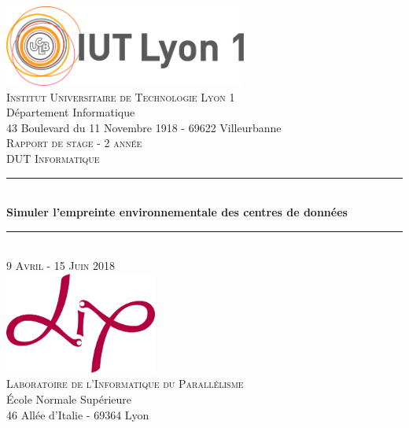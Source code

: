 \begin{titlepage}
\begin{spacing}{1}

\newcommand{\HRule}{\rule{\linewidth}{0.5mm}}
\center
 
\includegraphics[width=8cm]{pagedegarde/images/logo_iut.png}\\
\textsc{\large Institut Universitaire de Technologie Lyon 1} \\
\large Département Informatique\\43 Boulevard du 11 Novembre 1918 - 69622 Villeurbanne\\[3cm]


\textsc{\LARGE Rapport de stage - 2 année \\ DUT Informatique}\\
\HRule \\[0.8cm]
{ \huge \bfseries Simuler l'empreinte environnementale des centres de données}\\[0.4cm]
\HRule \\[0.5cm]

\textsc{\Large 9 Avril - 15 Juin 2018}\\[2cm]

\includegraphics[width=5cm]{pagedegarde/images/logo_lip.png}\\
\textsc{\large Laboratoire de l'Informatique du Parallélisme} \\
\large École Normale Supérieure \\ 46 Allée d'Italie - 69364 Lyon\\[2cm]


\end{spacing}
\end{titlepage}
